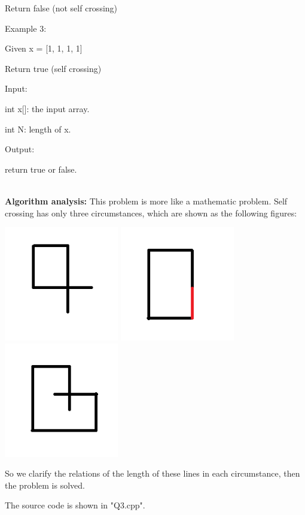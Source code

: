\documentclass[12pt,a4paper]{article}
\begin{document}
\begin{enumerate}
Return false (not self crossing)

Example 3:

Given x = [1, 1, 1, 1]

Return true (self crossing)

Input:

int x[]: the input array.

int N: length of x.

Output:

return true or false.

~\\

\textbf{Algorithm analysis:}
This problem is more like a mathematic problem. Self crossing has only three circumstances, which are shown as the following figures:

\includegraphics[width=5cm]{pic/1.png}
\includegraphics[width=5cm]{pic/2.png}
\includegraphics[width=5cm]{pic/3.png}

So we clarify the relations of the length of these lines in each circumstance, then the problem is solved.

The source code is shown in "Q3.cpp".

~\\
~\\

\end{enumerate}
\end{document}
